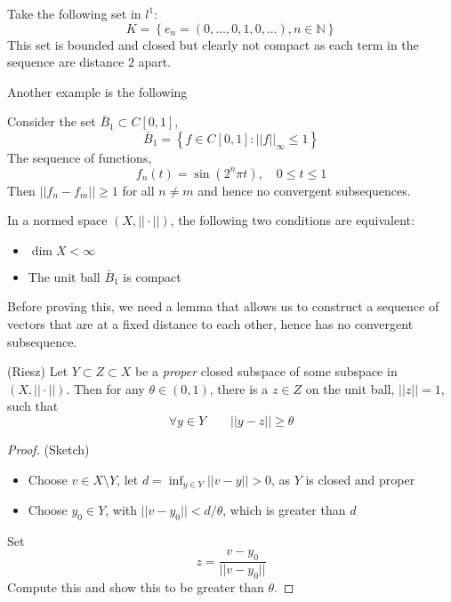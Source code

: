 \documentclass{article}
\begin{document}
\begin{eg}
    Take the following set in $l^1$:  
    \begin{equation*}
        K = \left\{ e_n = (0, \ldots, 0, 1, 0, \ldots), n \in \mathbb{N} \right\}
    \end{equation*}  
    This set is bounded and closed but clearly not compact as each term in the sequence
    are distance $2$ apart.  
\end{eg}  

Another example is the following  

\begin{eg}
    Consider the set $\bar{B}_1 \subset C[0,1]$,  
    \begin{equation*}
        \bar{B}_1 = \left\{ f \in C[0,1] : ||f||_{\infty} \leq 1 \right\}
    \end{equation*}  
    The sequence of functions,  
    \begin{equation*}
        f_n(t) = \sin(2^n \pi t), \quad 0 \leq t \leq 1
    \end{equation*}  
    Then $||f_n-f_m||\geq 1$ for all $n \neq m$ and hence no convergent subsequences. 
\end{eg}

\begin{thm}
    In a normed space $(X, ||\cdot||)$, the following two conditions are equivalent:  
    \begin{itemize}
        \item $\dim X < \infty$
        \item The unit ball $\bar{B}_1$ is compact 
    \end{itemize}
\end{thm}  
  
  
Before proving this, we need a lemma that allows us to construct a sequence of vectors
that are at a fixed distance to each other, hence has no convergent subsequence.  

\begin{lemma}
    (Riesz) Let $Y \subset Z \subset X$ be a \textit{proper} closed subspace of some subspace in $(X, ||\cdot||)$. Then for any $\theta \in (0,1)$, there is a $z\in Z$ on the unit ball, $||z||=1$, such that  
    \begin{equation*}
        \forall y \in Y \qquad ||y-z|| \geq \theta
    \end{equation*}
\end{lemma}  
\begin{proof}
(Sketch)  

\begin{itemize}
    \item Choose $v \in X \setminus Y$, let $d=\inf_{y\in Y}||v-y||>0$, as $Y$ is closed and proper
    \item Choose $y_0 \in Y$, with $||v-y_0||<d/\theta$, which is greater than $d$
\end{itemize}
Set
\begin{equation*}
    z = \frac{v-y_0}{||v-y_0||}
\end{equation*}  
Compute this and show this to be greater than $\theta$.
\end{proof}  
\end{document}
